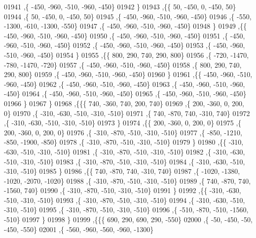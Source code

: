 \begin{DoxyCode}
01941     ,\{  -450,  -960,  -510,  -960,  -450\}
01942     \}
01943    ,\{\{    50,  -450,     0,  -450,    50\}
01944     ,\{    50,  -450,     0,  -450,    50\}
01945     ,\{  -450,  -960,  -510,  -960,  -450\}
01946     ,\{  -550, -1300,  -610, -1300,  -550\}
01947     ,\{  -450,  -960,  -510,  -960,  -450\}
01948     \}
01949    ,\{\{  -450,  -960,  -510,  -960,  -450\}
01950     ,\{  -450,  -960,  -510,  -960,  -450\}
01951     ,\{  -450,  -960,  -510,  -960,  -450\}
01952     ,\{  -450,  -960,  -510,  -960,  -450\}
01953     ,\{  -450,  -960,  -510,  -960,  -450\}
01954     \}
01955    ,\{\{   800,   290,   740,   290,   800\}
01956     ,\{  -720, -1470,  -780, -1470,  -720\}
01957     ,\{  -450,  -960,  -510,  -960,  -450\}
01958     ,\{   800,   290,   740,   290,   800\}
01959     ,\{  -450,  -960,  -510,  -960,  -450\}
01960     \}
01961    ,\{\{  -450,  -960,  -510,  -960,  -450\}
01962     ,\{  -450,  -960,  -510,  -960,  -450\}
01963     ,\{  -450,  -960,  -510,  -960,  -450\}
01964     ,\{  -450,  -960,  -510,  -960,  -450\}
01965     ,\{  -450,  -960,  -510,  -960,  -450\}
01966     \}
01967    \}
01968   ,\{\{\{   740,  -360,   740,   200,   740\}
01969     ,\{   200,  -360,     0,   200,     0\}
01970     ,\{  -310,  -630,  -510,  -310,  -510\}
01971     ,\{   740,  -870,   740,  -310,   740\}
01972     ,\{  -310,  -630,  -510,  -310,  -510\}
01973     \}
01974    ,\{\{   200,  -360,     0,   200,     0\}
01975     ,\{   200,  -360,     0,   200,     0\}
01976     ,\{  -310,  -870,  -510,  -310,  -510\}
01977     ,\{  -850, -1210,  -850, -1900,  -850\}
01978     ,\{  -310,  -870,  -510,  -310,  -510\}
01979     \}
01980    ,\{\{  -310,  -630,  -510,  -310,  -510\}
01981     ,\{  -310,  -870,  -510,  -310,  -510\}
01982     ,\{  -310,  -630,  -510,  -310,  -510\}
01983     ,\{  -310,  -870,  -510,  -310,  -510\}
01984     ,\{  -310,  -630,  -510,  -310,  -510\}
01985     \}
01986    ,\{\{   740,  -870,   740,  -310,   740\}
01987     ,\{ -1020, -1380, -1020, -2070, -1020\}
01988     ,\{  -310,  -870,  -510,  -310,  -510\}
01989     ,\{   740,  -870,   740, -1560,   740\}
01990     ,\{  -310,  -870,  -510,  -310,  -510\}
01991     \}
01992    ,\{\{  -310,  -630,  -510,  -310,  -510\}
01993     ,\{  -310,  -870,  -510,  -310,  -510\}
01994     ,\{  -310,  -630,  -510,  -310,  -510\}
01995     ,\{  -310,  -870,  -510,  -310,  -510\}
01996     ,\{  -510,  -870,  -510, -1560,  -510\}
01997     \}
01998    \}
01999   ,\{\{\{   690,   290,   690,   290,  -550\}
02000     ,\{   -50,  -450,   -50,  -450,  -550\}
02001     ,\{  -560,  -960,  -560,  -960, -1300\}

\end{DoxyCode}
